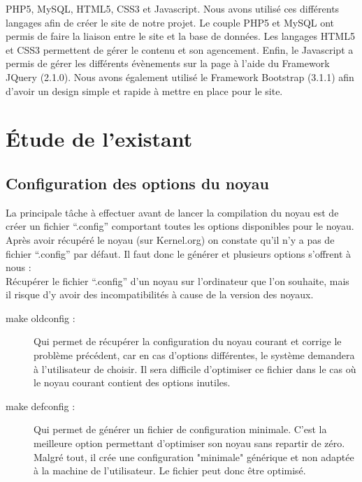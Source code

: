 \documentclass[16pts]{report}
\begin{document}
PHP5, MySQL, HTML5, CSS3 et Javascript. Nous avons utilisé ces différents 
langages afin de créer le site de notre projet. Le couple PHP5 et MySQL 
ont permis de faire la liaison entre le site et la base de données. Les 
langages HTML5 et CSS3 permettent de gérer le contenu et son agencement. 
Enfin, le Javascript a permis de gérer les différents évènements sur la 
page à l'aide du Framework JQuery (2.1.0). Nous avons également utilisé 
le Framework Bootstrap (3.1.1) afin d'avoir un design simple et rapide à 
mettre en place pour le site.
\\

\chapter{Étude de l'existant}
\label{cha:Étude de l'existant}

\section{Configuration des options du noyau}
\label{sec:Configuration des options du noyau}

La principale tâche à effectuer avant de lancer la compilation du noyau est de
créer un fichier “.config” comportant toutes les options disponibles pour le
noyau.  Après avoir récupéré le noyau (sur Kernel.org) on constate qu’il n’y a
pas de fichier “.config” par défaut. Il faut donc le générer et plusieurs
options s’offrent à nous :
\\

Récupérer le fichier “.config” d’un noyau sur l’ordinateur que l’on souhaite,
mais il risque d’y avoir des incompatibilités à cause de la version des noyaux.

\begin{description}
    \item[make oldconfig :] Qui permet de récupérer la configuration du noyau
        courant et corrige le problème précédent, car en cas d’options
        différentes, le système demandera à l’utilisateur de choisir. Il sera
        difficile d’optimiser ce fichier dans le cas où le noyau courant
        contient des options inutiles.

    \item[make defconfig :] Qui permet de générer un fichier de configuration
        minimale.  C’est la meilleure option permettant d’optimiser son noyau
        sans repartir de zéro.  Malgré tout, il crée une configuration
        "minimale" générique et non adaptée à la machine de l’utilisateur.
        Le fichier peut donc être optimisé.
\end{description}
\end{document}
